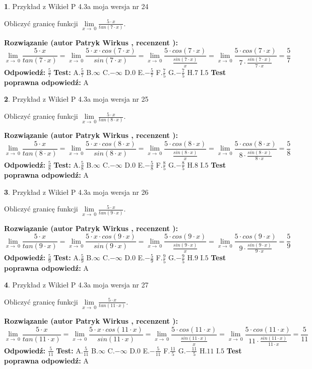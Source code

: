 \documentclass[12pt, a4paper]{article}
\theoremstyle{definition} %
\newtheorem{zad}{}
\newcommand{\zadStart}[1]{\begin{zad}#1\newline}
\newcommand{\zadStop}{\end{zad}}
\newcommand{\rozwStart}[2]{\noindent \textbf{Rozwiązanie (autor #1 , recenzent #2): }\newline}
\newcommand{\rozwStop}{\newline}
\newcommand{\odpStart}{\noindent \textbf{Odpowiedź:}\newline}
\newcommand{\odpStop}{\newline}
\newcommand{\testStart}{\noindent \textbf{Test:}\newline}
\newcommand{\testStop}{\newline}
\newcommand{\kluczStart}{\noindent \textbf{Test poprawna odpowiedź:}\newline}
\newcommand{\kluczStop}{\newline}
\begin{document}
\zadStart{Przykład z Wikieł P 4.3a moja wersja nr 24}


Obliczyć granicę funkcji $\lim\limits_{x\to\ 0}\frac{5 \cdot x}{tan(7 \cdot x)}$.
\zadStop
\rozwStart{Patryk Wirkus}{}
$$\lim\limits_{x\to\ 0}\frac{5 \cdot x}{tan(7 \cdot x)}=\lim\limits_{x\to\ 0}\frac{5 \cdot x \cdot cos(7 \cdot x)}{sin(7 \cdot x)}=\lim\limits_{x\to\ 0}\frac{5 \cdot cos(7 \cdot x)}{\frac{sin(7 \cdot x)}{x}}=\lim\limits_{x\to\ 0}\frac{5 \cdot cos(7 \cdot x)}{7 \cdot \frac{sin(7 \cdot x)}{7 \cdot x}} = \frac{5}{7}$$
\rozwStop
\odpStart
$\frac{5}{7}$
\odpStop
\testStart
A.$\frac{5}{7}$
B.$\infty$
C.$-\infty$
D.$0$
E.$-\frac{5}{7}$
F.$\frac{7}{5}$
G.$-\frac{7}{5}$
H.$7$
I.$5$
\testStop
\kluczStart
A
\kluczStop



\zadStart{Przykład z Wikieł P 4.3a moja wersja nr 25}


Obliczyć granicę funkcji $\lim\limits_{x\to\ 0}\frac{5 \cdot x}{tan(8 \cdot x)}$.
\zadStop
\rozwStart{Patryk Wirkus}{}
$$\lim\limits_{x\to\ 0}\frac{5 \cdot x}{tan(8 \cdot x)}=\lim\limits_{x\to\ 0}\frac{5 \cdot x \cdot cos(8 \cdot x)}{sin(8 \cdot x)}=\lim\limits_{x\to\ 0}\frac{5 \cdot cos(8 \cdot x)}{\frac{sin(8 \cdot x)}{x}}=\lim\limits_{x\to\ 0}\frac{5 \cdot cos(8 \cdot x)}{8 \cdot \frac{sin(8 \cdot x)}{8 \cdot x}} = \frac{5}{8}$$
\rozwStop
\odpStart
$\frac{5}{8}$
\odpStop
\testStart
A.$\frac{5}{8}$
B.$\infty$
C.$-\infty$
D.$0$
E.$-\frac{5}{8}$
F.$\frac{8}{5}$
G.$-\frac{8}{5}$
H.$8$
I.$5$
\testStop
\kluczStart
A
\kluczStop



\zadStart{Przykład z Wikieł P 4.3a moja wersja nr 26}


Obliczyć granicę funkcji $\lim\limits_{x\to\ 0}\frac{5 \cdot x}{tan(9 \cdot x)}$.
\zadStop
\rozwStart{Patryk Wirkus}{}
$$\lim\limits_{x\to\ 0}\frac{5 \cdot x}{tan(9 \cdot x)}=\lim\limits_{x\to\ 0}\frac{5 \cdot x \cdot cos(9 \cdot x)}{sin(9 \cdot x)}=\lim\limits_{x\to\ 0}\frac{5 \cdot cos(9 \cdot x)}{\frac{sin(9 \cdot x)}{x}}=\lim\limits_{x\to\ 0}\frac{5 \cdot cos(9 \cdot x)}{9 \cdot \frac{sin(9 \cdot x)}{9 \cdot x}} = \frac{5}{9}$$
\rozwStop
\odpStart
$\frac{5}{9}$
\odpStop
\testStart
A.$\frac{5}{9}$
B.$\infty$
C.$-\infty$
D.$0$
E.$-\frac{5}{9}$
F.$\frac{9}{5}$
G.$-\frac{9}{5}$
H.$9$
I.$5$
\testStop
\kluczStart
A
\kluczStop



\zadStart{Przykład z Wikieł P 4.3a moja wersja nr 27}


Obliczyć granicę funkcji $\lim\limits_{x\to\ 0}\frac{5 \cdot x}{tan(11 \cdot x)}$.
\zadStop
\rozwStart{Patryk Wirkus}{}
$$\lim\limits_{x\to\ 0}\frac{5 \cdot x}{tan(11 \cdot x)}=\lim\limits_{x\to\ 0}\frac{5 \cdot x \cdot cos(11 \cdot x)}{sin(11 \cdot x)}=\lim\limits_{x\to\ 0}\frac{5 \cdot cos(11 \cdot x)}{\frac{sin(11 \cdot x)}{x}}=\lim\limits_{x\to\ 0}\frac{5 \cdot cos(11 \cdot x)}{11 \cdot \frac{sin(11 \cdot x)}{11 \cdot x}} = \frac{5}{11}$$
\rozwStop
\odpStart
$\frac{5}{11}$
\odpStop
\testStart
A.$\frac{5}{11}$
B.$\infty$
C.$-\infty$
D.$0$
E.$-\frac{5}{11}$
F.$\frac{11}{5}$
G.$-\frac{11}{5}$
H.$11$
I.$5$
\testStop
\kluczStart
A
\kluczStop
\end{document}
